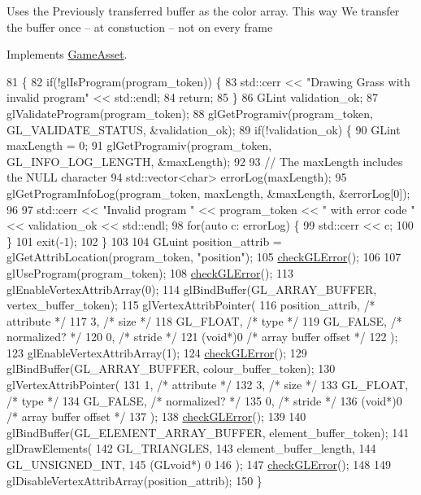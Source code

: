 Uses the Previously transferred buffer as the color array. This way We transfer the buffer once -- at constuction -- not on every frame

Implements \hyperlink{classGameAsset_a961aa51ca0a9961fc584c0b5d5431300}{Game\+Asset}.


\begin{DoxyCode}
81                                           \{
82   \textcolor{keywordflow}{if}(!glIsProgram(program\_token)) \{
83     std::cerr << \textcolor{stringliteral}{"Drawing Grass with invalid program"} << std::endl;
84     \textcolor{keywordflow}{return};
85   \}
86   GLint validation\_ok;
87   glValidateProgram(program\_token);
88   glGetProgramiv(program\_token, GL\_VALIDATE\_STATUS, &validation\_ok);
89   \textcolor{keywordflow}{if}(!validation\_ok) \{
90     GLint maxLength = 0;
91     glGetProgramiv(program\_token, GL\_INFO\_LOG\_LENGTH, &maxLength);
92 
93     \textcolor{comment}{// The maxLength includes the NULL character}
94     std::vector<char> errorLog(maxLength);
95     glGetProgramInfoLog(program\_token, maxLength, &maxLength, &errorLog[0]);
96 
97     std::cerr << \textcolor{stringliteral}{"Invalid program "} << program\_token << \textcolor{stringliteral}{" with error code "} << validation\_ok << std::endl;
98     \textcolor{keywordflow}{for}(\textcolor{keyword}{auto} c: errorLog) \{
99       std::cerr << c;
100     \}
101     exit(-1);
102   \}
103 
104   GLuint position\_attrib = glGetAttribLocation(program\_token, \textcolor{stringliteral}{"position"});
105   \hyperlink{GrassAsset_8cc_a75f201b0e53e68726854997957322b8d}{checkGLError}();
106 
107   glUseProgram(program\_token);
108   \hyperlink{GrassAsset_8cc_a75f201b0e53e68726854997957322b8d}{checkGLError}();
113   glEnableVertexAttribArray(0);
114   glBindBuffer(GL\_ARRAY\_BUFFER, vertex\_buffer\_token);
115   glVertexAttribPointer(
116     position\_attrib,        \textcolor{comment}{/* attribute */}
117     3,        \textcolor{comment}{/* size */}
118     GL\_FLOAT,   \textcolor{comment}{/* type */}
119     GL\_FALSE,   \textcolor{comment}{/* normalized? */}
120     0,        \textcolor{comment}{/* stride */}
121     (\textcolor{keywordtype}{void}*)0    \textcolor{comment}{/* array buffer offset */}
122   );
123   glEnableVertexAttribArray(1);
124   \hyperlink{GrassAsset_8cc_a75f201b0e53e68726854997957322b8d}{checkGLError}();
129   glBindBuffer(GL\_ARRAY\_BUFFER, colour\_buffer\_token);
130   glVertexAttribPointer(
131     1,        \textcolor{comment}{/* attribute */}
132     3,        \textcolor{comment}{/* size */}
133     GL\_FLOAT,   \textcolor{comment}{/* type */}
134     GL\_FALSE,   \textcolor{comment}{/* normalized? */}
135     0,        \textcolor{comment}{/* stride */}
136     (\textcolor{keywordtype}{void}*)0    \textcolor{comment}{/* array buffer offset */}
137   );
138   \hyperlink{GrassAsset_8cc_a75f201b0e53e68726854997957322b8d}{checkGLError}();
139 
140   glBindBuffer(GL\_ELEMENT\_ARRAY\_BUFFER, element\_buffer\_token);
141   glDrawElements(
142     GL\_TRIANGLES,
143     element\_buffer\_length,
144     GL\_UNSIGNED\_INT,
145     (GLvoid*) 0
146   );
147   \hyperlink{GrassAsset_8cc_a75f201b0e53e68726854997957322b8d}{checkGLError}();
148 
149   glDisableVertexAttribArray(position\_attrib);
150 \}
\end{DoxyCode}


